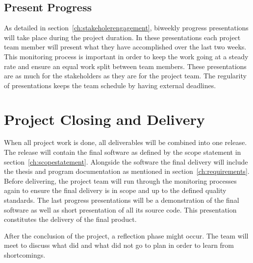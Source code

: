 \subsection{Present Progress}
\label{ch:presentprogress}
As detailed in section~\ref{ch:stakeholerengagement}, biweekly progress presentations will take place during the project duration. In these presentations each project team member will present what they have accomplished over the last two weeks. This monitoring process is important in order to keep the work going at a steady rate and ensure an equal work split between team members. These presentations are as much for the stakeholders as they are for the project team. The regularity of presentations keeps the team schedule by having external deadlines.


\section{Project Closing and Delivery}
\label{ch:projectclosing}
When all project work is done, all deliverables will be combined into one release. The release will contain the final software as defined by the scope statement in section~\ref{ch:scopestatement}. Alongside the software the final delivery will include the thesis and program documentation as mentioned in section~\ref{ch:requirements}. Before delivering, the project team will run through the monitoring processes again to ensure the final delivery is in scope and up to the defined quality standards. The last progress presentations will be a demonstration of the final software as well as short presentation of all its source code. This presentation constitutes the delivery of the final product.

After the conclusion of the project, a reflection phase might occur. The team will meet to discuss what did and what did not go to plan in order to learn from shortcomings.
